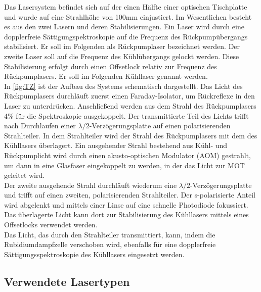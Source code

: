 \documentclass[
class=book,
accentcolor=1b,
custommargins=geometry,
fontsize=11pt,
thesis={type=Versuchsanleitung},
ruledheaders=all,
headline=false,
instbox=false,
marginpar=false,
title=small,
ignore-missing-data=true,
twoside=false,
pdfa=false %
]{apqpub}
\begin{document}
			Das Lasersystem befindet sich auf der einen Hälfte einer optischen Tischplatte und wurde auf eine Strahlhöhe von 100mm einjustiert. Im Wesentlichen besteht es aus den zwei Lasern und deren Stabilisierungen. Ein Laser wird durch eine dopplerfreie Sättigungspektroskopie auf die Frequenz des Rückpumpübergangs stabilisiert. Er soll im Folgenden als Rückpumplaser bezeichnet werden. Der zweite Laser soll auf die Frequenz des Kühlübergangs gelockt werden. Diese Stabilisierung erfolgt durch einen Offsetlock relativ zur Frequenz des Rückpumplasers. Er soll im Folgenden Kühllaser genannt werden.\\
			In \autoref{fig:TZ} ist der Aufbau des Systems schematisch dargestellt. Das Licht des Rückpumplasers durchläuft zuerst einen Faraday-Isolator, um Rückreflexe in den Laser zu unterdrücken. Anschließend werden aus dem Strahl des Rückpumplasers 4\% für die Spektroskopie ausgekoppelt. Der transmittierte Teil des Lichts trifft nach Durchlaufen einer $\lambda/2$-Verzögerungsplatte auf einen polarisierenden Strahlteiler. In dem Strahlteiler wird der Strahl des Rückpumplasers mit dem des Kühllasers überlagert. Ein ausgehender Strahl bestehend aus Kühl- und Rückpumplicht wird durch einen akusto-optischen Modulator (AOM) gestrahlt, um dann in eine Glasfaser eingekoppelt zu werden, in der das Licht zur MOT geleitet wird.\\
			Der zweite ausgehende Strahl durchläuft wiederum eine $\lambda/2$-Verzögerungsplatte und trifft auf einen zweiten, polarisierenden Strahlteiler. Der s-polarisierte Anteil wird abgelenkt und mittels einer Linse auf eine schnelle Photodiode fokussiert. Das überlagerte Licht kann dort zur Stabilisierung des Kühllasers mittels eines Offsetlocks verwendet werden.\\
			Das Licht, das durch den Strahlteiler transmittiert, kann, indem die Rubidiumdampfzelle verschoben wird, ebenfalls für eine dopplerfreie Sättigungsspektroskopie des Kühllasers eingesetzt werden.\\
			
			\subsection{Verwendete Lasertypen}
			
\end{document}
